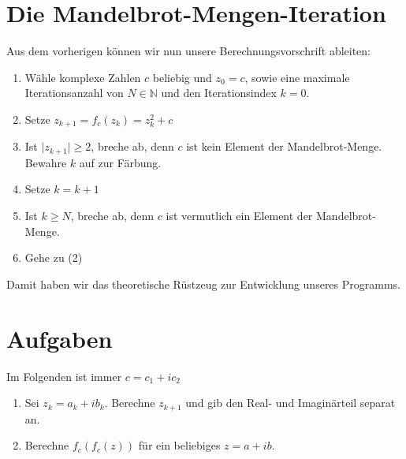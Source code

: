 \section{Die Mandelbrot-Mengen-Iteration}

Aus dem vorherigen können wir nun unsere Berechnungsvorschrift ableiten:

\begin{enumerate}
\item Wähle komplexe Zahlen $c$ beliebig und $z_0=c$, sowie eine maximale Iterationsanzahl von $N\in \mathbb{N}$ und den Iterationsindex $k=0$.
\item Setze $z_{k+1} = f_c(z_k) = z_k^2 +c$
\item Ist $\vert z_{k+1} \vert \ge 2$, breche ab, denn $c$ ist kein Element der Mandelbrot-Menge. Bewahre $k$ auf zur Färbung.
\item Setze $k = k+1$
\item Ist $k\ge N$, breche ab, denn $c$ ist vermutlich ein Element der Mandelbrot-Menge. 
\item Gehe zu (2)
\end{enumerate}

Damit haben wir das theoretische Rüstzeug zur Entwicklung unseres Programms.

\section{Aufgaben}
Im Folgenden ist immer $c=c_1+ic_2$
\begin{enumerate}
\item Sei $z_k = a_k+ib_k$. Berechne $z_{k+1}$ und gib den Real- und Imaginärteil separat an. 
\item Berechne $f_c\left( f_c(z)\right)$ für ein beliebiges $z = a+ib$.
\end{enumerate}

